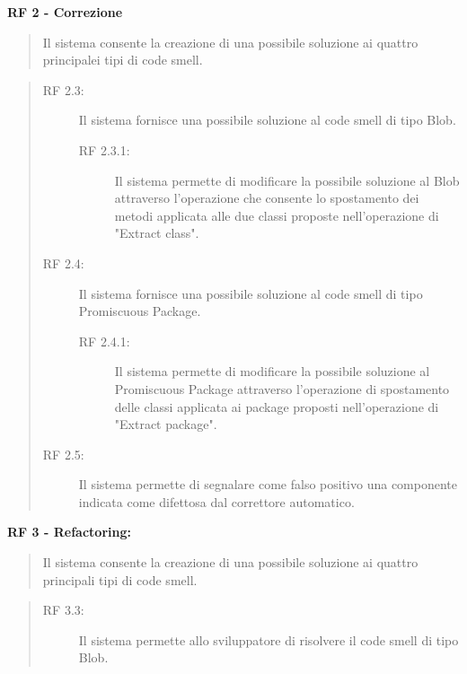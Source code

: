 \begin{list}{-}{}
	\item \textbf{RF 2 - Correzione} 
	\begin{quote}Il sistema consente la creazione di una possibile soluzione ai quattro principalei tipi di code smell.\end{quote}
	\begin{quote}
		\begin{description}    		 	
			\item [RF 2.3:]Il sistema fornisce una possibile soluzione al code smell di tipo Blob. 
			
				\begin{description}
					\item[RF 2.3.1:] Il sistema permette di modificare la possibile soluzione al Blob attraverso l'operazione che consente lo spostamento dei metodi applicata alle due classi proposte nell'operazione di "Extract class".		
				\end{description}
			
			\item[RF 2.4:] Il sistema fornisce una possibile soluzione al code smell di tipo Promiscuous Package.  
			
				\begin{description}
					\item[RF 2.4.1:] Il sistema permette di modificare la possibile soluzione al Promiscuous Package attraverso l'operazione di spostamento delle classi applicata ai package proposti nell'operazione di "Extract package".	
				\end{description}
			
			\item[RF 2.5:] Il sistema permette di segnalare come falso positivo una componente indicata come difettosa dal correttore automatico.
			
		\end{description}
	\end{quote}
	\item \textbf{RF 3 - Refactoring:} 
	\begin{quote}Il sistema consente la creazione di una possibile soluzione ai quattro principali tipi di code smell.\end{quote}
	\begin{quote}
		\begin{description}
			\item[RF 3.3:]Il sistema permette allo sviluppatore di risolvere il code smell di tipo Blob.
			

\end{description}
\end{quote}
\end{list}

